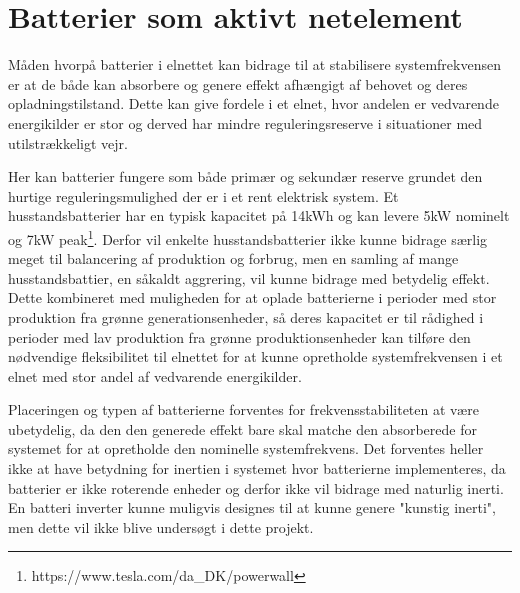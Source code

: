 \section{Batterier som aktivt netelement}

Måden hvorpå batterier i elnettet kan bidrage til at stabilisere systemfrekvensen er at de både kan absorbere og genere effekt afhængigt af behovet og deres opladningstilstand. Dette kan give fordele i et elnet, hvor andelen er vedvarende energikilder er stor og derved har mindre reguleringsreserve i situationer med utilstrækkeligt vejr.

Her kan batterier fungere som både primær og sekundær reserve grundet den hurtige reguleringsmulighed der er i et rent elektrisk system. Et husstandsbatterier har en typisk kapacitet på 14kWh og kan levere 5kW nominelt og 7kW peak\footnote{https://www.tesla.com/da\_DK/powerwall}. Derfor vil enkelte husstandsbatterier ikke kunne bidrage særlig meget til balancering af produktion og forbrug, men en samling af mange husstandsbattier, en såkaldt aggrering, vil kunne bidrage med betydelig effekt. Dette kombineret med muligheden for at oplade batterierne i perioder med stor produktion fra grønne generationsenheder, så deres kapacitet er til rådighed i perioder med lav produktion fra grønne produktionsenheder kan tilføre den nødvendige fleksibilitet til elnettet for at kunne opretholde systemfrekvensen i et elnet med stor andel af vedvarende energikilder.

Placeringen og typen af batterierne forventes for frekvensstabiliteten at være ubetydelig, da den den generede effekt bare skal matche den absorberede for systemet for at opretholde den nominelle systemfrekvens. Det forventes heller ikke at have betydning for inertien i systemet hvor batterierne implementeres, da batterier er ikke roterende enheder og derfor ikke vil bidrage med naturlig inerti. En batteri inverter kunne muligvis designes til at kunne genere "kunstig inerti", men dette vil ikke blive undersøgt i dette projekt.


